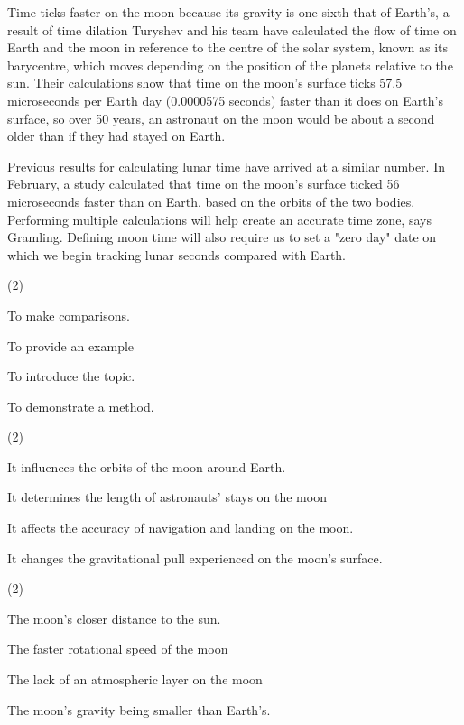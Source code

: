 \documentclass{英语试卷}
\begin{document}
\par Time ticks faster on the moon because its gravity is one-sixth that of Earth's, a result of time dilation Turyshev and his team have calculated the flow of time on Earth and the moon in reference to the centre of the solar system, known as its barycentre, which moves depending on the position of the planets relative to the sun. Their calculations show that time on the moon's surface ticks 57.5 microseconds per Earth day (0.0000575 seconds) faster than it does on Earth's surface, so over 50 years, an astronaut on the moon would be about a second older than if they had stayed on Earth.\par
\par Previous results for calculating lunar time have arrived at a similar number. In February, a study calculated that time on the moon's surface ticked 56 microseconds faster than on Earth, based on the orbits of the two bodies. Performing multiple calculations will help create an accurate time zone, says Gramling. Defining moon time will also require us to set a "zero day" date on which we begin tracking lunar seconds compared with Earth.\par
{}
\begin{choices}(2)
  \item To make comparisons.
  \item To provide an example
  \item To introduce the topic.
  \item To demonstrate a method.
\end{choices}
\begin{choices}(2)
  \item It influences the orbits of the moon around Earth.
  \item It determines the length of astronauts' stays on the moon
  \item It affects the accuracy of navigation and landing on the moon.
  \item It changes the gravitational pull experienced on the moon's surface.
\end{choices}
\begin{choices}(2)
  \item The moon's closer distance to the sun.
  \item The faster rotational speed of the moon
  \item The lack of an atmospheric layer on the moon
  \item The moon's gravity being smaller than Earth's.
\end{choices}
\end{document}

